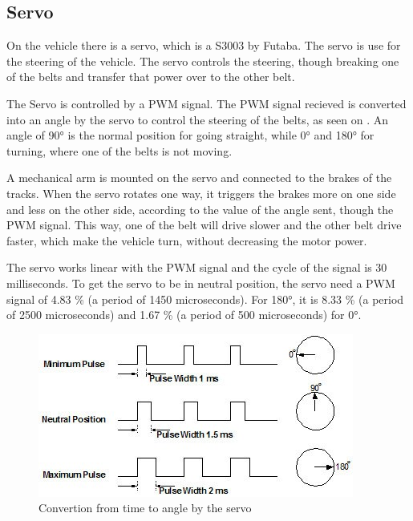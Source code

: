 \subsection{Servo}
On the vehicle there is a servo, which is a S3003 by Futaba.
The servo is use for the steering of the vehicle. The servo controls the steering, though breaking one of the belts and transfer that power over to the other belt.


The Servo is controlled by a PWM signal. The PWM signal recieved is converted into an angle by the servo to control the steering of the belts, as seen on . An angle of 90° is the normal position for going straight, while 0° and 180° for turning, where one of the belts is not moving. 

A mechanical arm is mounted on the servo and connected to the brakes of the tracks. When the servo rotates one way, it triggers the brakes more on one side and less on the other side, according to the value of the angle sent, though the PWM signal. This way, one of the belt will drive slower and the other belt drive faster, which make the vehicle turn, without decreasing the motor power.

The servo works linear with the PWM signal and the cycle of the signal is 30 milliseconds. To get the servo to be in neutral position, the servo need a PWM signal of 4.83 \% (a period of 1450 microseconds). For 180°, it is 8.33 \% (a period of 2500 microseconds) and 1.67 \% (a period of 500 microseconds) for 0°. \\


\begin{figure}[H]
	\centering
	\includegraphics[scale=1]{figures/timeVSangle.jpg}
	\caption{Convertion from time to angle by the servo\cite {AServos}}
	\label{timeVSangle}
\end{figure}


